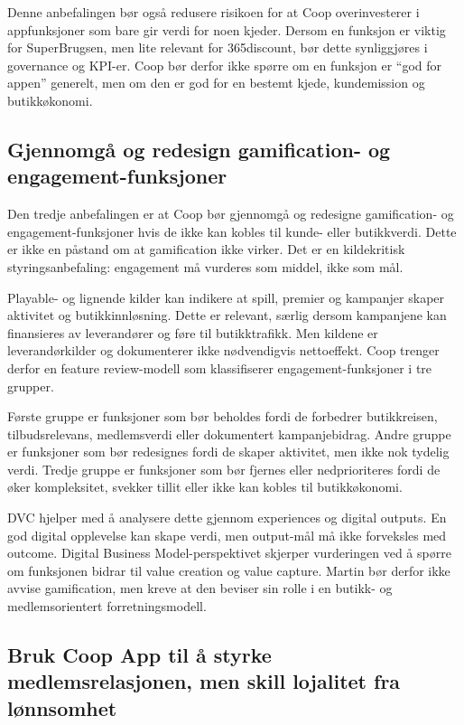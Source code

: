 \documentclass[12pt,a4paper]{article}
\begin{document}
Denne anbefalingen bør også redusere risikoen for at Coop overinvesterer i appfunksjoner som bare gir verdi for noen kjeder. Dersom en funksjon er viktig for SuperBrugsen, men lite relevant for 365discount, bør dette synliggjøres i governance og KPI-er. Coop bør derfor ikke spørre om en funksjon er ``god for appen'' generelt, men om den er god for en bestemt kjede, kundemission og butikkøkonomi.

\subsection{Gjennomgå og redesign gamification- og engagement-funksjoner}

Den tredje anbefalingen er at Coop bør gjennomgå og redesigne gamification- og engagement-funksjoner hvis de ikke kan kobles til kunde- eller butikkverdi. Dette er ikke en påstand om at gamification ikke virker. Det er en kildekritisk styringsanbefaling: engagement må vurderes som middel, ikke som mål.

Playable- og lignende kilder kan indikere at spill, premier og kampanjer skaper aktivitet og butikkinnløsning. Dette er relevant, særlig dersom kampanjene kan finansieres av leverandører og føre til butikktrafikk. Men kildene er leverandørkilder og dokumenterer ikke nødvendigvis nettoeffekt. Coop trenger derfor en feature review-modell som klassifiserer engagement-funksjoner i tre grupper.

Første gruppe er funksjoner som bør beholdes fordi de forbedrer butikkreisen, tilbudsrelevans, medlemsverdi eller dokumentert kampanjebidrag. Andre gruppe er funksjoner som bør redesignes fordi de skaper aktivitet, men ikke nok tydelig verdi. Tredje gruppe er funksjoner som bør fjernes eller nedprioriteres fordi de øker kompleksitet, svekker tillit eller ikke kan kobles til butikkøkonomi.

DVC hjelper med å analysere dette gjennom experiences og digital outputs. En god digital opplevelse kan skape verdi, men output-mål må ikke forveksles med outcome. Digital Business Model-perspektivet skjerper vurderingen ved å spørre om funksjonen bidrar til value creation og value capture. Martin bør derfor ikke avvise gamification, men kreve at den beviser sin rolle i en butikk- og medlemsorientert forretningsmodell.

\subsection{Bruk Coop App til å styrke medlemsrelasjonen, men skill lojalitet fra lønnsomhet}
\end{document}
